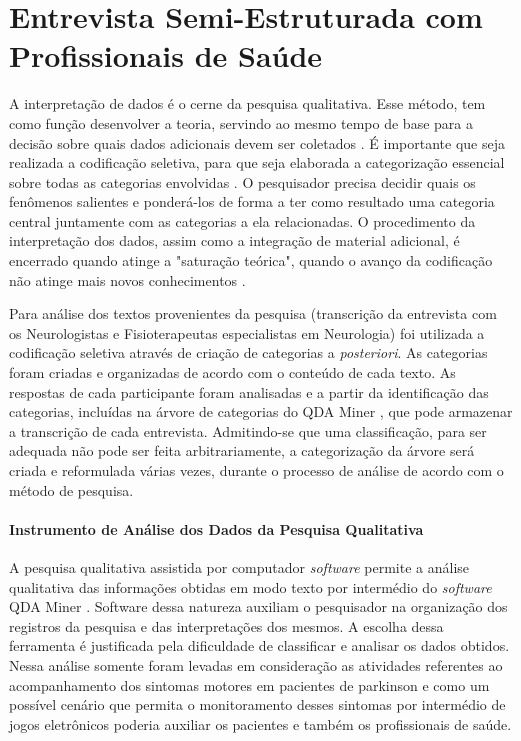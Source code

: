\chapter{Entrevista Semi-Estruturada com Profissionais de Saúde}\label{chapter:entrevista_semi_estruturada}

A interpretação de dados é o cerne da pesquisa qualitativa. Esse método, tem como função desenvolver a teoria, servindo ao mesmo tempo de base para a decisão sobre quais dados adicionais devem ser coletados \cite{FLI04}. É importante que seja realizada a codificação seletiva, para que seja elaborada a categorização essencial sobre todas as categorias envolvidas \cite{FLI04}. O pesquisador precisa decidir quais os fenômenos salientes e ponderá-los de forma a ter como resultado uma categoria central juntamente com as categorias a ela relacionadas. O procedimento da interpretação dos dados, assim como a integração de material adicional, é encerrado quando atinge a "saturação teórica", quando o avanço da codificação não atinge mais novos conhecimentos \cite{FLI04}.

Para análise dos textos provenientes da pesquisa (transcrição da entrevista com os Neurologistas e Fisioterapeutas especialistas em Neurologia) foi utilizada a codificação seletiva através de criação de categorias a \emph{posteriori}. As categorias foram criadas e organizadas de acordo com o conteúdo de cada texto. As respostas de cada participante foram analisadas e a partir da identificação das categorias, incluídas na árvore de categorias do QDA Miner \cite{qda13}, que pode armazenar a transcrição de cada entrevista. Admitindo-se que uma classificação, para ser adequada não pode ser feita arbitrariamente, a categorização da árvore será criada e reformulada várias vezes, durante o processo de análise de acordo com o método de pesquisa\cite{FLI04}.


\subsubsection{Instrumento de Análise dos Dados da Pesquisa Qualitativa} \label{section:analise_dados} 
A pesquisa qualitativa assistida por computador \textit{software} permite a análise qualitativa das informações obtidas em modo texto
por intermédio do \textit{software} QDA Miner \cite{qda13}. Software dessa natureza auxiliam o pesquisador na organização dos registros da pesquisa e das interpretações dos mesmos. A escolha dessa ferramenta é justificada pela dificuldade de classificar e analisar os dados obtidos. Nessa análise somente foram levadas em consideração as atividades referentes ao acompanhamento dos sintomas motores em pacientes de parkinson e como um possível cenário que permita o monitoramento desses sintomas por intermédio de jogos eletrônicos poderia auxiliar os pacientes e também os profissionais de saúde.


